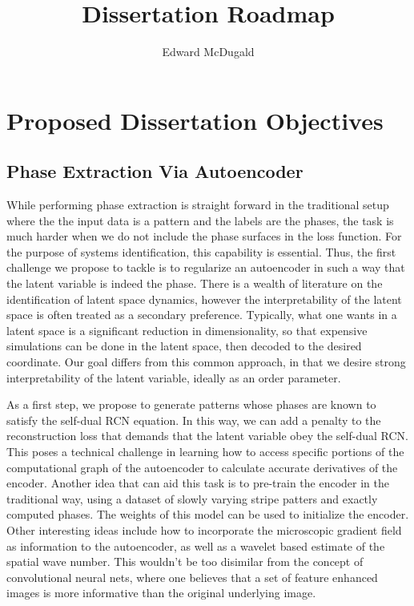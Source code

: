 \documentclass[12pt]{article}
\title{Dissertation Roadmap}
\author{Edward McDugald}
\numberwithin{equation}{section}
\begin{document}
\maketitle


\section{Proposed Dissertation Objectives}
\subsection{Phase Extraction Via Autoencoder}
\par While performing phase extraction is straight forward in the traditional setup where the the input data is a pattern and the labels are the phases, the task is much harder when we do not include the phase surfaces in the loss function.
For the purpose of systems identification, this capability is essential. Thus, the first challenge we propose to tackle is to regularize an autoencoder in such a way that the latent variable is indeed the phase. There is a wealth of literature on the identification of latent space dynamics, however the interpretability of the latent space is often treated as a secondary preference. Typically, what one wants in a latent space is a significant reduction in dimensionality, so that expensive simulations can be done in the latent space, then decoded to the desired coordinate.
Our goal differs from this common approach, in that we desire strong interpretability of the latent variable, ideally as an order parameter.
\par As a first step, we propose to generate patterns whose phases are known to satisfy the self-dual RCN equation. In this way, we can add a penalty to the reconstruction loss that demands that the latent variable obey the self-dual RCN. This poses a technical challenge in learning how to access specific portions of the computational graph of the autoencoder to calculate accurate derivatives of the encoder.
Another idea that can aid this task is to pre-train the encoder in the traditional way, using a dataset of slowly varying stripe patters and exactly computed phases. The weights of this model can be used to initialize the encoder. Other interesting ideas include how to incorporate the microscopic gradient field as information to the autoencoder, as well as a wavelet based estimate of the spatial wave number. This wouldn't be too disimilar from the concept of convolutional neural nets, where one believes that a set of feature enhanced images is more informative than the original underlying image.
\end{document}
